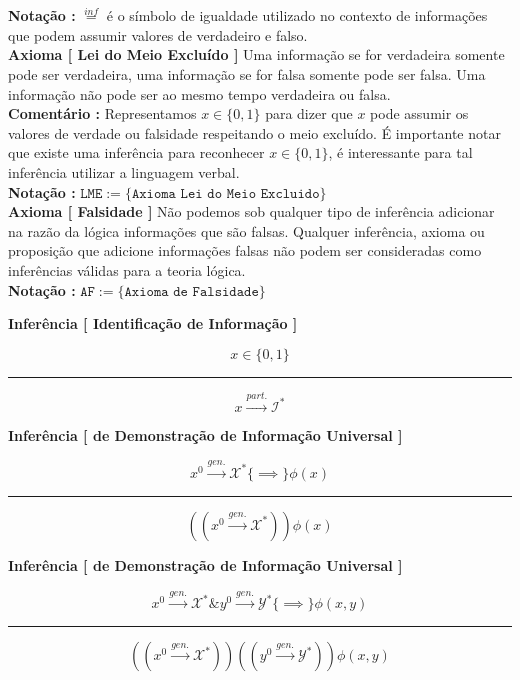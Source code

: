 \documentclass[10pt,a4paper]{report}
\begin{document}
\textbf{Notação :} $\overset{inf}{=}$ é o símbolo de igualdade utilizado no contexto de informações que podem assumir valores de verdadeiro e falso.\\



\textbf{Axioma [ Lei do Meio Excluído ]} Uma informação se for verdadeira somente pode ser verdadeira, uma informação se for falsa somente pode ser falsa. Uma informação não pode ser ao mesmo tempo verdadeira ou falsa.\\

\textbf{Comentário :} Representamos $x \in \{0,1\}$ para dizer que $x$ pode assumir os valores de verdade ou falsidade respeitando o meio excluído. É importante notar que existe uma inferência para reconhecer $x \in \{0,1 \}$, é interessante para tal inferência utilizar a linguagem verbal.\\

\textbf{Notação :} $\texttt{LME} := \{ \texttt{Axioma Lei do Meio Excluido} \} $\\

\textbf{Axioma [ Falsidade ]} Não podemos sob qualquer tipo de inferência adicionar na razão da lógica informações que são falsas. Qualquer inferência, axioma ou proposição que adicione informações falsas não podem ser consideradas como inferências válidas para a teoria lógica.\\

\textbf{Notação :} $\texttt{AF} := \{ \texttt{Axioma de Falsidade} \} $




\hspace{\baselineskip}

\textbf{Inferência [ Identificação de Informação ]} 

$$ x \in \{0,1\} $$
\hrule
$$ x \overset{part.}{\rightarrow} \mathcal{I}^* $$

\textbf{Inferência [ de Demonstração de Informação Universal ]}

$$ x^0 \overset{gen.}{\rightarrow} \mathcal{X}^* \{\implies\} \phi(x)  $$
\hrule
$$ ((x^0 \overset{gen.} {\rightarrow} \mathcal{X}^* )) \phi(x) $$

\textbf{Inferência [ de Demonstração de Informação Universal ]}

$$ x^0 \overset{gen.}{\rightarrow} \mathcal{X}^* \& y^0 \overset{gen.}{\rightarrow} \mathcal{Y}^* \{\implies\} \phi(x,y)  $$
\hrule
$$ ((x^0 \overset{gen.} {\rightarrow} \mathcal{X}^* )) ((y^0 \overset{gen.} {\rightarrow} \mathcal{Y}^* )) \phi(x,y) $$
\end{document}
